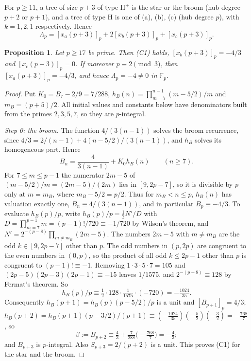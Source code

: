\documentclass[11pt]{article}
\newtheorem{proposition}[lemma]{Proposition}
\theoremstyle{remark}
\newcommand{\res}[1]{[#1]_p}
\begin{document}
For $p\ge11$, a tree of size $p+3$ of type $\mathrm H^+$ is the star or the broom (hub degree $p+2$ or $p+1$), and a tree of type H is one of (a), (b), (c) (hub degree $p$), with $k=1,2,1$ respectively. Hence
\[
 \Lambda_p=\res{x_a(p+3)}+2\res{x_b(p+3)}+\res{x_c(p+3)} .
\]

\begin{proposition}\label{prop:nearstar}
Let $p\ge17$ be prime. Then (C1) holds, $\res{x_b(p+3)}=-4/3$ and $\res{x_c(p+3)}=0$. If moreover $p\equiv2\pmod3$, then $\res{x_a(p+3)}=-4/3$, and hence $\Lambda_p=-4\ne0$ in $\mathbb F_p$.
\end{proposition}
\begin{proof}
Put $K_0=B_7-2/9=7/288$, $h_B(n)=\prod_{m=7}^{n-1}(m-5/2)/m$ and $m_B=(p+5)/2$. All initial values and constants below have denominators built from the primes $2,3,5,7$, so they are $p$-integral.

\emph{Step 0: the broom.} The function $4/(3(n-1))$ solves the broom recurrence, since $4/3=2/(n-1)+4(n-5/2)/(3(n-1))$, and $h_B$ solves its homogeneous part. Hence
\[
 B_n=\frac4{3(n-1)}+K_0h_B(n)\qquad(n\ge7).
\]
For $7\le m\le p-1$ the numerator $2m-5$ of $(m-5/2)/m=(2m-5)/(2m)$ lies in $[9,2p-7]$, so it is divisible by $p$ only at $m=m_B$, where $m_B-5/2=p/2$. Thus for $m_B<n\le p$, $h_B(n)$ has valuation exactly one, $B_n\equiv4/(3(n-1))$, and in particular $B_p\equiv-4/3$. To evaluate $h_B(p)/p$, write $h_B(p)/p=\frac12N'/D$ with $D=\prod_{m=7}^{p-1}m=(p-1)!/720\equiv-1/720$ by Wilson's theorem, and $N'=2^{-(p-8)}\prod_{m\ne m_B}(2m-5)$. The numbers $2m-5$ with $m\ne m_B$ are the odd $k\in[9,2p-7]$ other than $p$. The odd numbers in $(p,2p)$ are congruent to the even numbers in $(0,p)$, so the product of all odd $k\le2p-1$ other than $p$ is congruent to $(p-1)!\equiv-1$. Removing $1\cdot3\cdot5\cdot7=105$ and $(2p-5)(2p-3)(2p-1)\equiv-15$ leaves $1/1575$, and $2^{-(p-8)}\equiv128$ by Fermat's theorem. So
\[
 h_B(p)/p\equiv\tfrac12\cdot128\cdot\tfrac1{1575}\cdot(-720)=-\tfrac{1024}{35}.
\]
Consequently $h_B(p+1)=h_B(p)(p-5/2)/p$ is a unit and $\res{B_{p+1}}=4/3$; $h_B(p+2)=h_B(p+1)(p-3/2)/(p+1)\equiv(-\frac{1024}{35})(-\frac52)(-\frac32)=-\frac{768}7$, so
\[
 \beta:=B_{p+2}\equiv\tfrac43+\tfrac7{288}\bigl(-\tfrac{768}7\bigr)=-\tfrac43 ;
\]
and $B_{p+3}$ is $p$-integral. Also $S_{p+3}=2/(p+2)$ is a unit. This proves (C1) for the star and the broom.


\end{proof}
\end{document}
